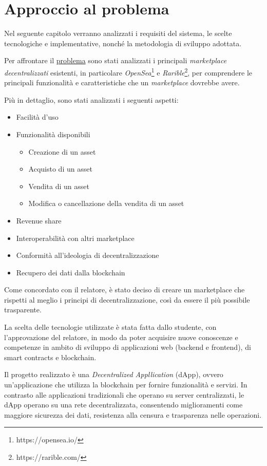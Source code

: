 \chapter{Approccio al problema}
\label{sec:approccioProblema}

Nel seguente capitolo verranno analizzati i requisiti del sistema, le scelte tecnologiche e implementative, nonché la metodologia di sviluppo adottata. 

Per affrontare il \hyperref[sec:problema]{problema} sono stati analizzati i principali \textit{marketplace decentralizzati} esistenti, in particolare \textit{OpenSea}\footnote{https://opensea.io/} e \textit{Rarible}\footnote{https://rarible.com/}, per comprendere le principali funzionalità e caratteristiche che un \textit{marketplace} dovrebbe avere.

Più in dettaglio, sono stati analizzati i seguenti aspetti:
\begin{itemize}
    \item Facilità d'uso
    \item Funzionalità disponibili
    \begin{itemize}
        \item Creazione di un asset
        \item Acquisto di un asset
        \item Vendita di un asset
        \item Modifica o cancellazione della vendita di un asset
    \end{itemize}
    \item Revenue share
    \item Interoperabilità con altri marketplace
    \item Conformità all'ideologia di decentralizzazione
    \item Recupero dei dati dalla blockchain
\end{itemize}

Come concordato con il relatore, è stato deciso di creare un marketplace che rispetti al meglio i principi di decentralizzazione, così da essere il più possibile trasparente. 

La scelta delle tecnologie utilizzate è stata fatta dallo studente, con l'approvazione del relatore, in modo da poter acquisire nuove conoscenze e competenze in ambito di sviluppo di applicazioni web (backend e frontend), di smart contracts e blockchain.

Il progetto realizzato è una \textit{Decentralized Appllication} (dApp), ovvero un'applicazione che utilizza la blockchain per fornire funzionalità e servizi. In contrasto alle applicazioni tradizionali che operano su server centralizzati, le dApp operano su una rete decentralizzata, consentendo miglioramenti come maggiore sicurezza dei dati, resistenza alla censura e trasparenza nelle operazioni. \cite{bitpanda-dApp}

